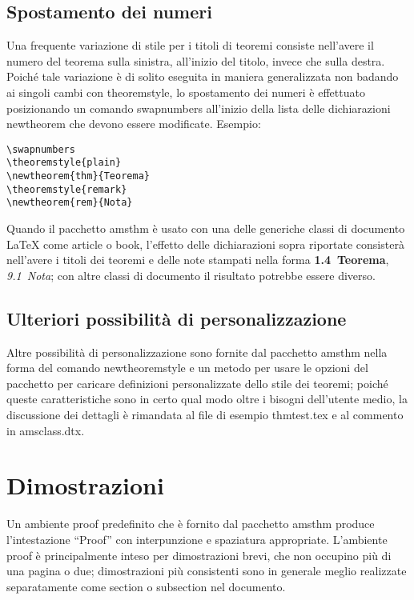 \documentclass[a4paper]{article}
\providecommand{\qq}[1]{\textquotedblleft#1\textquotedblright}
\newcommand{\ntt}{%
  \fontfamily\ttdefault \fontseries\mddefault \fontshape\updefault
  \selectfont
}
\DeclareRobustCommand{\cn}[1]{{\ntt\bslchar#1}}
\DeclareRobustCommand{\cls}[1]{{\ntt#1}}
\DeclareRobustCommand{\pkg}[1]{{\ntt#1}}
\DeclareRobustCommand{\env}[1]{{\ntt#1}}
\DeclareRobustCommand{\fn}[1]{{\ntt#1}}
\def\latex/{{\protect\LaTeX}}
\begin{document}
\subsection{Spostamento dei numeri}

Una frequente variazione di stile per i titoli di teoremi consiste
nell'avere il numero del teorema sulla sinistra, all'inizio del titolo,
invece che sulla destra. Poich\'e tale variazione \`e di solito eseguita
in maniera generalizzata non badando ai singoli cambi con \cn{theoremstyle},
lo spostamento dei numeri \`e effettuato posizionando un
comando\cn{swapnumbers} all'inizio della lista delle dichiarazioni
\cn{newtheorem} che devono essere modificate. Esempio:
\begin{verbatim}
\swapnumbers
\theoremstyle{plain}
\newtheorem{thm}{Teorema}
\theoremstyle{remark}
\newtheorem{rem}{Nota}
\end{verbatim}
Quando il pacchetto \pkg{amsthm} \`e usato con una delle generiche
classi di documento \latex/
come \cls{article} o \cls{book}, l'effetto delle dichiarazioni sopra
riportate consister\`a nell'avere i titoli dei teoremi e delle note
stampati nella forma \textbf{1.4~Teorema}, \textit{9.1~Nota}; con altre
classi di documento il risultato potrebbe essere diverso.

\subsection{Ulteriori possibilit\`a di personalizzazione}

Altre possibilit\`a di personalizzazione sono fornite dal pacchetto
\pkg{amsthm} nella forma del comando \cn{newtheoremstyle} e un metodo
per usare le opzioni del pacchetto per caricare definizioni
personalizzate dello stile dei teoremi; poich\'e queste caratteristiche
sono in certo qual modo oltre i bisogni dell'utente medio, la
discussione dei dettagli \`e rimandata al file di esempio
\fn{thmtest.tex} e al commento in \fn{amsclass.dtx}.

\section{Dimostrazioni}

Un ambiente \env{proof} predefinito che \`e fornito dal pacchetto \pkg{amsthm}
produce l'intestazione \qq{Proof} con interpunzione e spaziatura
appropriate.
L'ambiente \env{proof} \`e principalmente inteso per
dimostrazioni brevi, che non occupino pi\`u di una pagina o due;
dimostrazioni pi\`u consistenti sono in generale meglio realizzate
separatamente come \cn{section} o \cn{subsection} nel documento.
\end{document}
